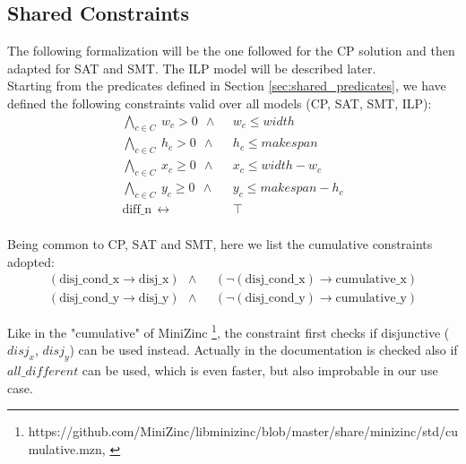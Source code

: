 

\subsection{Shared Constraints} \label{sec:shared_constraints}
    The following formalization will be the one followed for the CP solution and then adapted for
    SAT and SMT. The ILP model will be described later. \\

    Starting from the predicates defined in Section \ref{sec:shared_predicates}, we have defined 
    the following constraints valid over all models (CP, SAT, SMT, ILP):
    \begin{align*}
        \bigwedge_{c \in C}\ w_c > 0\ \    \land\                   &\ w_c \leq width \\
        \bigwedge_{c \in C}\ h_c > 0\ \   \land\                    &\ h_c \leq makespan \\
        \bigwedge_{c \in C}\ x_c \geq 0\ \ \land\                   &\ x_c \leq width - w_c \\
        \bigwedge_{c \in C}\ y_c \geq 0\ \ \land\                   &\ y_c \leq makespan - h_c \\
        \text{diff\_n}\ \ \leftrightarrow\ &\ \top \\
    \end{align*}
    
    Being common to CP, SAT and SMT, here we list the cumulative constraints adopted:
    \begin{align*}
        (\text{disj\_cond\_x} \rightarrow \text{disj\_x})\ \ \land\ &\ (\neg (\text{disj\_cond\_x}) \rightarrow \text{cumulative\_x}) \\
        (\text{disj\_cond\_y} \rightarrow \text{disj\_y})\ \ \land\ &\ (\neg (\text{disj\_cond\_y}) \rightarrow \text{cumulative\_y})
    \end{align*}

    Like in the "cumulative" of MiniZinc \footnote[1]{https://github.com/MiniZinc/libminizinc/blob/master/share/minizinc/std/cumulative.mzn, \label{fn:minizinc_cumulative}}, 
    the constraint first checks if disjunctive ($disj_x$, $disj_y$) can be used instead. 
    Actually in the documentation 
    is checked also if $all\_different$ can be used, which is even faster, but also improbable in our use case. 


